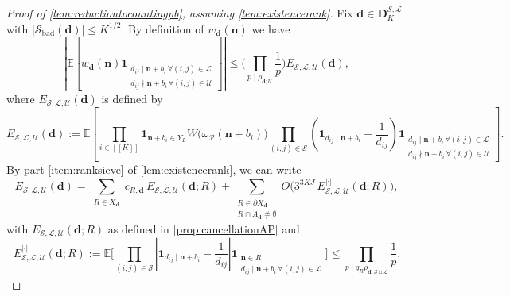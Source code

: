 \documentclass[11pt]{amsart}
\theoremstyle{definition}
\renewcommand{\leq}{\leqslant}
\newcommand{\sinterval}[1]{[\![#1]\!] }
\newcommand{\abs}[1]{\left|#1\right|}
\newcommand{\ind}[1]{\mathbf{1}_{#1}}
\newcommand{\E}{\mathbb{E}}
\newcommand{\primes}{\mathcal{P}}
\renewcommand{\d}{\boldsymbol{d}}
\newcommand{\pcomp}[2]{d_{#1#2}}
\newcommand{\n}{\mathbf{n}}
\newcommand{\sommespart}{b}
\newcommand{\fprod}[1]{\rho_{#1}}
\newcommand{\progression}{A_{\d}}
\newcommand{\lit}{\mathcal{L}}
\newcommand{\unlit}{\mathcal{U}}
\newcommand{\s}{\mathcal{S}}
\newcommand{\fancyD}{\mathbf{D}}
\newcommand{\Dss}{\fancyD^{\s,\lit}_{\!\repK}}
\newcommand{\elln}{L}
\newcommand{\Y}{Y_{\!\elln}}
\newcommand{\modulus}{q}
\newcommand{\Xd}{X_{\d}}
\newcommand{\repR}{J}
\newcommand{\repK}{K}
\newcommand{\newK}{\sinterval{K}}
\newcommand{\kbad}{\s_{\mathrm{bad}}(\d)}
\begin{document}
\begin{proof}[Proof of \cref{lem:reductiontocountingpb}, assuming \cref{lem:existencerank}]
Fix $\d\in \Dss$ with $|{\kbad}| \leq \repK^{1/2}$. By definition of $w_{\d}(\n)$ we have
\begin{equation*}
\abs{\E \left[w_{\d}(\n) \ind{\substack{\pcomp{i}{j}\mid \n+\sommespart_i \, \forall (i,j)\in \lit \\ \pcomp{i}{j}\nmid \n+\sommespart_i \, \forall (i,j)\in \unlit}} \right]} 
\leq \Bigg(\prod_{p\mid \fprod{\d; \unlit}} \frac{1}{p}\Bigg) E_{\s,\lit,\unlit}(\d),
\end{equation*}
where $E_{\s,\lit,\unlit}(\d)$ is defined by
\begin{equation*}
E_{\s,\lit,\unlit}(\d) := \E \left[\prod_{i\in \newK} \ind{\n+\sommespart_i\in \Y} W\big(\omega_{\primes}(\n+\sommespart_i)\big)\prod_{(i,j)\in \s} \left(\ind{\pcomp{i}{j}\mid \n + \sommespart_i} - \frac{1}{\pcomp{i}{j}}\right) \ind{\substack{\pcomp{i}{j}\mid \n+\sommespart_i \, \forall (i,j)\in \lit \\ \pcomp{i}{j}\nmid \n+\sommespart_i \, \forall (i,j)\in \unlit}} \right].
\end{equation*}
By part \cref{item:ranksieve} of \cref{lem:existencerank}, we can write
\begin{equation}
\label{eq:usesieve}
E_{\s,\lit,\unlit}(\d) = \sum_{\substack{R\in \Xd}} c_{R,\d}\, E_{\s,\lit,\unlit}(\d; R) + \sum_{\substack{R\in \partial\Xd \\ R\cap \progression \neq \emptyset}}  O\Big(3^{3\repK \repR} \, E_{\s,\lit,\unlit}^{|\cdot|}(\d; R)\Big),
\end{equation} 
with $E_{\s,\lit,\unlit}(\d; R)$ as defined in \cref{prop:cancellationAP} and 
\begin{equation*}
E_{\s,\lit,\unlit}^{|\cdot|}(\d; R) := \E \bigg[\prod_{(i,j)\in \s} \abs{\ind{\pcomp{i}{j}\mid \n + \sommespart_i} - \frac{1}{\pcomp{i}{j}}} \ind{\substack{\n\in R\qquad \qquad\\\pcomp{i}{j}\mid \n+\sommespart_i \, \forall (i,j)\in \lit}} \bigg] \leq \prod_{p\mid \modulus_{R} \fprod{\d; \s \sqcup \lit}} \frac{1}{p}.
\end{equation*}


\end{proof}
\end{document}
